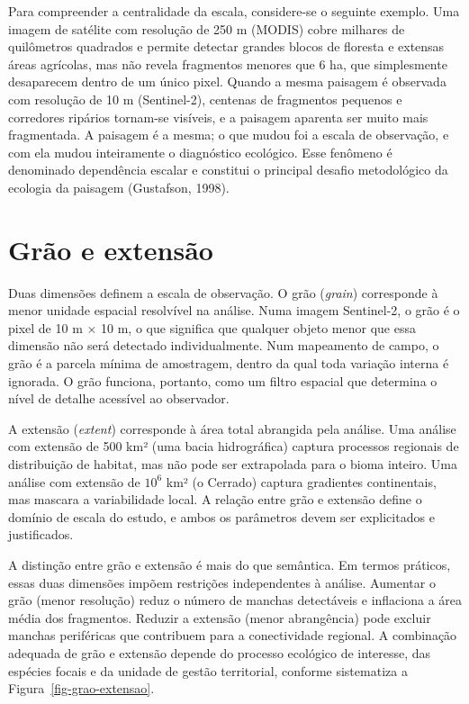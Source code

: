 \documentclass[
  portuguese,
  11pt,
  a4paper,
  open=any]{scrbook}
\begin{document}
Para compreender a centralidade da escala, considere-se o seguinte
exemplo. Uma imagem de satélite com resolução de 250 m (MODIS) cobre
milhares de quilômetros quadrados e permite detectar grandes blocos de
floresta e extensas áreas agrícolas, mas não revela fragmentos menores
que 6 ha, que simplesmente desaparecem dentro de um único pixel. Quando
a mesma paisagem é observada com resolução de 10 m (Sentinel-2),
centenas de fragmentos pequenos e corredores ripários tornam-se
visíveis, e a paisagem aparenta ser muito mais fragmentada. A paisagem é
a mesma; o que mudou foi a escala de observação, e com ela mudou
inteiramente o diagnóstico ecológico. Esse fenômeno é denominado
dependência escalar e constitui o principal desafio metodológico da
ecologia da paisagem (Gustafson, 1998).

\section{Grão e extensão}\label{gruxe3o-e-extensuxe3o}

Duas dimensões definem a escala de observação. O grão (\emph{grain})
corresponde à menor unidade espacial resolvível na análise. Numa imagem
Sentinel-2, o grão é o pixel de 10 m × 10 m, o que significa que
qualquer objeto menor que essa dimensão não será detectado
individualmente. Num mapeamento de campo, o grão é a parcela mínima de
amostragem, dentro da qual toda variação interna é ignorada. O grão
funciona, portanto, como um filtro espacial que determina o nível de
detalhe acessível ao observador.

A extensão (\emph{extent}) corresponde à área total abrangida pela
análise. Uma análise com extensão de 500 km² (uma bacia hidrográfica)
captura processos regionais de distribuição de habitat, mas não pode ser
extrapolada para o bioma inteiro. Uma análise com extensão de \(10^6\)
km² (o Cerrado) captura gradientes continentais, mas mascara a
variabilidade local. A relação entre grão e extensão define o domínio de
escala do estudo, e ambos os parâmetros devem ser explicitados e
justificados.

A distinção entre grão e extensão é mais do que semântica. Em termos
práticos, essas duas dimensões impõem restrições independentes à
análise. Aumentar o grão (menor resolução) reduz o número de manchas
detectáveis e inflaciona a área média dos fragmentos. Reduzir a extensão
(menor abrangência) pode excluir manchas periféricas que contribuem para
a conectividade regional. A combinação adequada de grão e extensão
depende do processo ecológico de interesse, das espécies focais e da
unidade de gestão territorial, conforme sistematiza a
Figura~\ref{fig-grao-extensao}.
\end{document}
